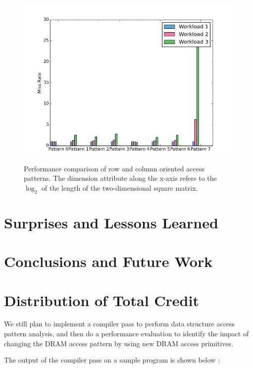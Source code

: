 \documentclass[letterpaper]{article}
\begin{document}
\begin{figure}[ht]
	\centering
	\includegraphics[scale=0.35]{images/128_cache}
	\caption{Performance comparison of row and column oriented access patterns.
	The dimension attribute along the x-axis refers to the $\log_2$ of the length of the two-dimensional square matrix. }
	\label{fig:perf}
\end{figure}



\section{Surprises and Lessons Learned}

\section{Conclusions and Future Work}

\section{Distribution of Total Credit}

We still plan to implement a compiler pass to perform data structure access pattern analysis, and
then do a performance evaluation to identify the impact of changing the DRAM
access pattern by using new DRAM access primitives.

The output of the compiler pass on a sample program is shown below :
\end{document}
